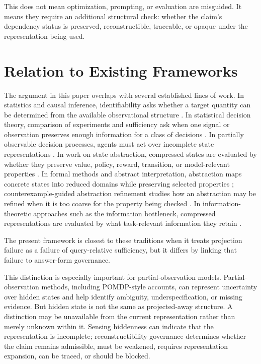 \documentclass[11pt]{article}
\begin{document}
This does not mean optimization, prompting, or evaluation are misguided. It means they require an additional structural check: whether the claim's dependency status is preserved, reconstructible, traceable, or opaque under the representation being used.

\section{Relation to Existing Frameworks}

The argument in this paper overlaps with several established lines of work. In statistics and causal inference, identifiability asks whether a target quantity can be determined from the available observational structure \cite{Pearl2009}. In statistical decision theory, comparison of experiments and sufficiency ask when one signal or observation preserves enough information for a class of decisions \cite{Blackwell1953}. In partially observable decision processes, agents must act over incomplete state representations \cite{Kaelbling1998}. In work on state abstraction, compressed states are evaluated by whether they preserve value, policy, reward, transition, or model-relevant properties \cite{Li2006}. In formal methods and abstract interpretation, abstraction maps concrete states into reduced domains while preserving selected properties \cite{Cousot1977}; counterexample-guided abstraction refinement studies how an abstraction may be refined when it is too coarse for the property being checked \cite{Clarke2000}. In information-theoretic approaches such as the information bottleneck, compressed representations are evaluated by what task-relevant information they retain \cite{Tishby1999}.

The present framework is closest to these traditions when it treats projection failure as a failure of query-relative sufficiency, but it differs by linking that failure to answer-form governance.

This distinction is especially important for partial-observation models. Partial-observation methods, including POMDP-style accounts, can represent uncertainty over hidden states and help identify ambiguity, underspecification, or missing evidence. But hidden state is not the same as projected-away structure. A distinction may be unavailable from the current representation rather than merely unknown within it. Sensing hiddenness can indicate that the representation is incomplete; reconstructibility governance determines whether the claim remains admissible, must be weakened, requires representation expansion, can be traced, or should be blocked.
\end{document}
